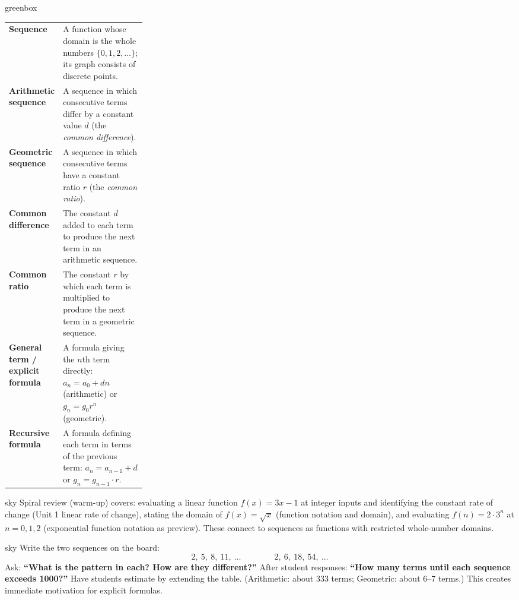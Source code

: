 \documentclass[10pt]{article}
\begin{document}
\begin{skillbox}{greenbox}
\renewcommand{\arraystretch}{1.4}
\begin{tabularx}{\linewidth}{@{} >{\leavevmode\bfseries\color{navy}}p{0.27\linewidth} X @{}}
Sequence            & A function whose domain is the whole numbers $\{0, 1, 2, \ldots\}$; its graph consists of discrete points. \\
Arithmetic sequence & A sequence in which consecutive terms differ by a constant value $d$ (the \textit{common difference}). \\
Geometric sequence  & A sequence in which consecutive terms have a constant ratio $r$ (the \textit{common ratio}). \\
Common difference   & The constant $d$ added to each term to produce the next term in an arithmetic sequence. \\
Common ratio        & The constant $r$ by which each term is multiplied to produce the next term in a geometric sequence. \\
General term / explicit formula & A formula giving the $n$th term directly: $a_n = a_0 + dn$ (arithmetic) or $g_n = g_0 r^n$ (geometric). \\
Recursive formula   & A formula defining each term in terms of the previous term: $a_n = a_{n-1} + d$ or $g_n = g_{n-1} \cdot r$. \\
\end{tabularx}
\end{skillbox}

\begin{skillbox}{sky}
    Spiral review (warm-up) covers: evaluating a linear function $f(x) = 3x - 1$ at integer
    inputs and identifying the constant rate of change (Unit 1 linear rate of change), stating
    the domain of $f(x) = \sqrt{x}$ (function notation and domain), and evaluating
    $f(n) = 2 \cdot 3^n$ at $n = 0, 1, 2$ (exponential function notation as preview).
    These connect to sequences as functions with restricted whole-number domains.
\end{skillbox}

\begin{skillbox}[Hook]{sky}
Write the two sequences on the board:
\[
  2,\ 5,\ 8,\ 11,\ \ldots \qquad\qquad 2,\ 6,\ 18,\ 54,\ \ldots
\]
Ask: \textbf{``What is the pattern in each? How are they different?''}
After student responses: \textbf{``How many terms until each sequence exceeds 1000?''}
Have students estimate by extending the table. (Arithmetic: about 333 terms;
Geometric: about 6--7 terms.) This creates immediate motivation for explicit formulas.
\end{skillbox}
\end{document}
